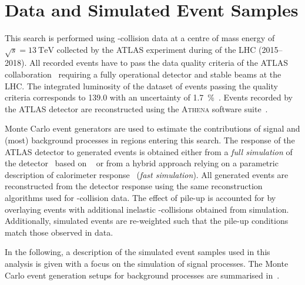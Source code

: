 \section{Data and Simulated Event Samples}
\label{sec:data_and_simulation}

This search is performed using \pp-collision data at a centre of mass
energy of $\sqrt{s} = \SI{13}{\TeV}$ collected by the ATLAS experiment
during \RunTwo of the LHC (2015--2018). All recorded events have to
pass the data quality criteria of the ATLAS
collaboration~\cite{DAPR-2018-01} requiring a fully operational
detector and stable beams at the LHC. The integrated luminosity of the
dataset of events passing the quality criteria corresponds to
\SI{139.0}{\ifb} with an uncertainty of
\SI{1.7}{\percent}~\cite{ATLAS-CONF-2019-021}.
Events recorded by the ATLAS detector are reconstructed using the
\textsc{Athena} software suite~\cite{ATL-SOFT-PUB-2021-001}.


Monte Carlo event generators are used to estimate the contributions of
signal and (most) background processes in regions entering this
search. The response of the ATLAS detector to generated events is
obtained either from a \emph{full simulation} of the
detector~\cite{SOFT-2010-01} based on \GEANT~\cite{Agostinelli:2002hh}
or from a hybrid approach relying on a parametric description of
calorimeter response~\cite{SOFT-2010-01} (\emph{fast simulation}). All
generated events are reconstructed from the detector response using
the same reconstruction algorithms used for \pp-collision data. The
effect of pile-up is accounted for by overlaying events with
additional inelastic \pp-collisions obtained from
simulation. Additionally, simulated events are re-weighted such that
the pile-up conditions match those observed in data.

In the following, a description of the simulated event samples used in
this analysis is given with a focus on the simulation of signal
processes. The Monte Carlo event generation setups for background
processes are summarised in~.


